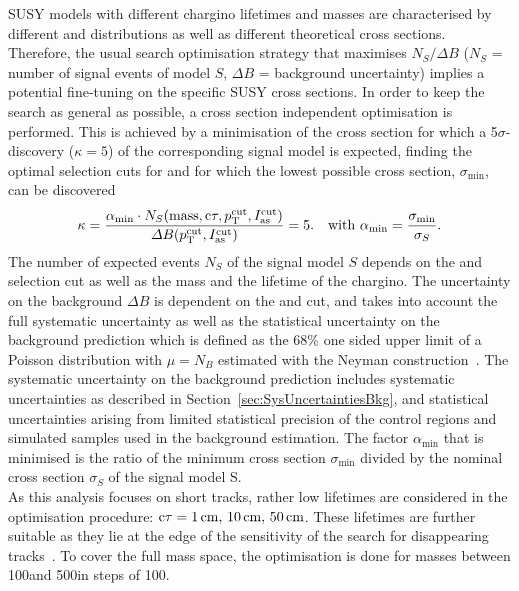 SUSY models with different chargino lifetimes and masses are characterised by different \pt and \ias distributions as well as different theoretical cross sections.
Therefore, the usual search optimisation strategy that maximises $N_S/\Delta B$ ($N_S$ = number of signal events of model $S$, $\Delta B$ = background uncertainty) implies a potential fine-tuning on the specific SUSY cross sections.
In order to keep the search as general as possible, a cross section independent optimisation is performed.
This is achieved by a minimisation of the cross section for which a 5$\sigma$-discovery ($\kappa=5$) of the corresponding signal model is expected, \ie finding the optimal selection cuts for \pt and \ias for which the lowest possible cross section, $\sigma_{\text{min}}$, can be discovered
\begin{align}
\label{eq:optimisation}
\kappa = \frac{\alpha_{\text{min}} \cdot N_S(\text{mass},\text{c}\tau,p_{\text{T}}^{\text{cut}}, I_{\text{as}}^{\text{cut}})}{\Delta B (p_{\text{T}}^{\text{cut}}, I_{\text{as}}^{\text{cut}})} = 5. && \text{with   } \alpha_{\text{min}} = \frac{\sigma_{\text{min}}}{\sigma_{S}}.
\end{align}
The number of expected events $N_S$ of the signal model $S$ depends on the \pt and \ias selection cut as well as the mass and the lifetime of the chargino.
The uncertainty on the background $\Delta B$ is dependent on the \pt and \ias cut, and takes into account the full systematic uncertainty as well as the statistical uncertainty on the background prediction which is defined as the 68\% one sided upper limit of a Poisson distribution with $\mu = N_B$ estimated with the Neyman construction~\cite{bib:Neyman_1937,bib:PDG_2014}.
The systematic uncertainty on the background prediction includes systematic uncertainties as described in Section~\ref{sec:SysUncertaintiesBkg}, and statistical uncertainties arising from limited statistical precision of the control regions and simulated samples used in the background estimation.
The factor $\alpha_{\text{min}}$  that is minimised is the ratio of the minimum cross section $\sigma_{\text{min}}$ divided by the nominal cross section $\sigma_{S}$ of the signal model S.\\

As this analysis focuses on short tracks, rather low lifetimes are considered in the optimisation procedure: $\text{c}\tau=1\,\text{cm},\,10\,\text{cm},\,50\,\text{cm}$.
These lifetimes are further suitable as they lie at the edge of the sensitivity of the search for disappearing tracks~\cite{bib:CMS:DT_8TeV}.
To cover the full mass space, the optimisation is done for masses between 100\gev and 500\gev in steps of 100\gev.


